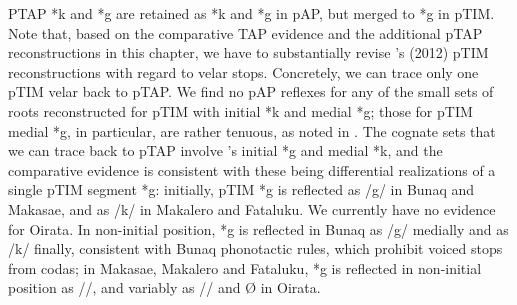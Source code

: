 PTAP *k and *g are retained as *k and *g in pAP, but merged to *g in pTIM. Note that, based on the comparative TAP evidence and the additional pTAP reconstructions in this chapter, we have to substantially revise \citeauthor{SchapperEtAl2012}'s (2012) pTIM reconstructions with regard to velar stops. Concretely, we can trace only one pTIM velar back to pTAP. We find no pAP reflexes for any of the small sets of roots reconstructed for pTIM with initial *k and medial *g; those for pTIM medial *g, in particular, are rather tenuous, as noted in \citet[212]{SchapperEtAl2012}. The cognate sets that we can trace back to pTAP involve \citeauthor{SchapperEtAl2012}'s initial *g and medial *k, and the comparative evidence is consistent with these being differential realizations of a single pTIM segment *g: initially, pTIM *g is reflected as /g/ in Bunaq and Makasae, and as /k/ in Makalero and Fataluku. We currently have no evidence for Oirata. In non-initial position, *g is reflected in Bunaq as /g/ medially and as /k/ finally, consistent with Bunaq phonotactic rules, which prohibit voiced stops from codas; in Makasae, Makalero and Fataluku, *g is reflected in non-initial position as /{\textglotstop}/, and variably as /{\textglotstop}/ and {\O} in Oirata. 
 

